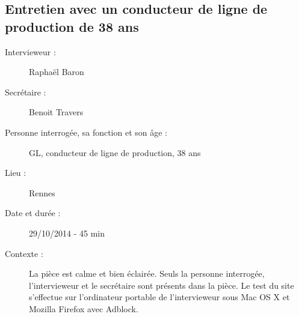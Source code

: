 \subsection{Entretien avec un conducteur de ligne de production de 38 ans}

\begin{description}
\item [Intervieweur : ] Rapha\"{e}l Baron
\item [Secr\'{e}taire : ] Benoit Travers
\item [Personne interrog\'{e}e, sa fonction et son \^{a}ge : ] GL, conducteur de ligne de production, 38 ans
\item [Lieu : ] Rennes
\item [Date et dur\'{e}e : ] 29/10/2014 - 45 min
\item [Contexte : ] La pi\`{e}ce est calme et bien \'{e}clair\'{e}e. Seuls la personne interrog\'{e}e, l'intervieweur et le secr\'{e}taire sont pr\'{e}sents dans la pi\`{e}ce. Le test du site s'effectue sur l'ordinateur portable de l'intervieweur sous Mac OS X et Mozilla Firefox avec Adblock. 

\end{description}


